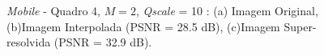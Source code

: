 \begin{figure}[H]
    \centering
    \qquad
	

    \caption{\textit{Mobile} - Quadro 4, $M = 2$, \textit{Qscale} = 10 : (a) Imagem Original, (b)Imagem Interpolada (PSNR = 28.5 dB), (c)Imagem Super-resolvida (PSNR = 32.9 dB).}
	    
    \label{fig:3}
\end{figure}

